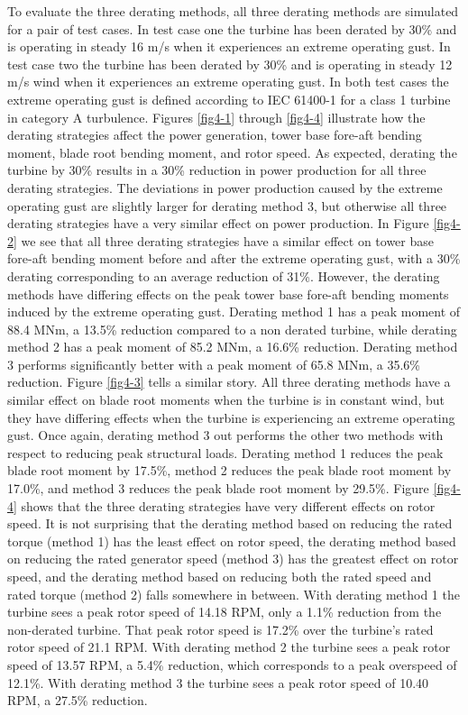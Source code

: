 To evaluate the three derating methods, all three derating methods are simulated for a pair of test cases. In test case one the turbine has been derated by 30\% and is operating in steady 16 m/s when it experiences an extreme operating gust. In test case two the turbine has been derated by 30\% and is operating in steady 12 m/s wind when it experiences an extreme operating gust. In both test cases the extreme operating gust is defined according to IEC 61400-1 \cite{IEC2005} for a class 1 turbine in category A turbulence. Figures \ref{fig4-1} through \ref{fig4-4} illustrate how the derating strategies affect the power generation, tower base fore-aft bending moment, blade root bending moment, and rotor speed. As expected, derating the turbine by 30\% results in a 30\% reduction in power production for all three derating strategies. The deviations in power production caused by the extreme operating gust are slightly larger for derating method 3, but otherwise all three derating strategies have a very similar effect on power production. In Figure \ref{fig4-2} we see that all three derating strategies have a similar effect on tower base fore-aft bending moment before and after the extreme operating gust, with a 30\% derating corresponding to an average reduction of 31\%. However, the derating methods have differing effects on the peak tower base fore-aft bending moments induced by the extreme operating gust. Derating method 1 has a peak moment of 88.4 MNm, a 13.5\% reduction compared to a non derated turbine, while derating method 2 has a peak moment of 85.2 MNm, a 16.6\% reduction. Derating method 3 performs significantly better with a peak moment of 65.8 MNm, a 35.6\% reduction. Figure \ref{fig4-3} tells a similar story. All three derating methods have a similar effect on blade root moments when the turbine is in constant wind, but they have differing effects when the turbine is experiencing an extreme operating gust. Once again, derating method 3 out performs the other two methods with respect to reducing peak structural loads. Derating method 1 reduces the peak blade root moment by 17.5\%, method 2 reduces the  peak blade root moment by 17.0\%, and method 3 reduces the peak blade root moment by 29.5\%. Figure \ref{fig4-4} shows that the three derating strategies have very different effects on rotor speed. It is not surprising that the derating method based on reducing the rated torque (method 1) has the least effect on rotor speed, the derating method based on reducing the rated generator speed (method 3) has the greatest effect on rotor speed, and the derating method based on reducing both the rated speed and rated torque (method 2) falls somewhere in between. With derating method 1 the turbine sees a peak rotor speed of 14.18 RPM, only a 1.1\% reduction from the non-derated turbine. That peak rotor speed is 17.2\% over the turbine's rated rotor speed of 21.1 RPM. With derating method 2 the turbine sees a peak rotor speed of 13.57 RPM, a 5.4\% reduction, which corresponds to a peak overspeed of 12.1\%. With derating method 3 the turbine sees a peak rotor speed of 10.40 RPM, a 27.5\% reduction.


